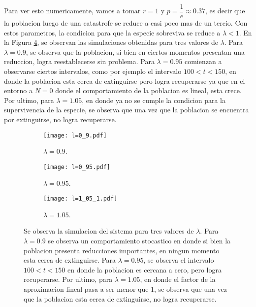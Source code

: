 Para ver esto numericamente, vamos a tomar $r=1$ y $p=\dfrac{1}{e}\approx0.37$, es decir que la poblacion luego de una catastrofe se reduce a casi poco mas de un tercio. Con estos parametros, la condicion para que la especie sobreviva se reduce a $\lambda<1$. En la Figura \ref{05_ejercicio}, se observan las simulaciones obtenidas para tres valores de $\lambda$. Para $\lambda=0.9$, se observa que la poblacion, si bien en ciertos momentos presentan una reduccion, logra reestablecerse sin problema. Para $\lambda=0.95$ comienzan a observarse ciertos intervalos, como por ejemplo el intervalo $100<t<150$, en donde la poblacion esta cerca de extinguirse pero logra recuperarse ya que en el entorno a $N=0$ donde el comportamiento de la poblacion es lineal, esta crece. Por ultimo, para $\lambda=1.05$, en donde ya no se cumple la condicion para la supervivencia de la especie, se observa que una vez que la poblacion se encuentra por extinguirse, no logra recuperarse. 

\begin{figure}
    \centering
    \begin{subfigure}[b]{0.32\textwidth}
        \texttt{[image: l=0\_9.pdf]}
        \caption{$\lambda=0.9$.}
        \label{05_l_9}
    \end{subfigure}
    \hfill
    \begin{subfigure}[b]{0.32\textwidth}
        \texttt{[image: l=0\_95.pdf]}
        \caption{$\lambda=0.95$.}
        \label{05_l_95}
    \end{subfigure}
    \hfill
    \begin{subfigure}[b]{0.32\textwidth}
        \texttt{[image: l=1\_05\_1.pdf]}
        \caption{$\lambda=1.05$.}
        \label{05_l_105}
    \end{subfigure}
    \caption{Se observa la simulacion del sistema para tres valores de $\lambda$. Para $\lambda=0.9$ se observa un comportamiento stocastico en donde si bien la poblacion presenta reducciones importantes, en ningun momento esta cerca de extinguirse. Para $\lambda=0.95$, se observa el intervalo $100<t<150$ en donde la poblacion es cercana a cero, pero logra recuperarse. Por ultimo, para $\lambda=1.05$, en donde el factor de la aproximacion lineal pasa a ser menor que 1, se observa que una vez que la poblacion esta cerca de extinguirse, no logra recuperarse.}
    \label{05_ejercicio}
\end{figure}

